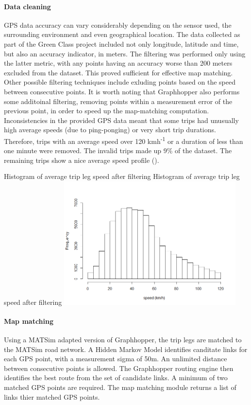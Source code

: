 \paragraph{Data cleaning}
GPS data accuracy can vary considerably depending on the sensor used, the surrounding environment and even geographical location.
The data collected as part of the Green Class project included not only longitude, latitude and time, but also an accuracy indicator, in meters.
The filtering was performed only using the latter metric, with any points having an accuracy worse than 200 meters excluded from the dataset.
This proved sufficient for effective map matching.
Other possible filtering techniques include exluding points based on the speed between consecutive points.
It is worth noting that Graphhopper also performs some additoinal filtering, removing points within a measurement error of the previous point, in order to speed up the map-matching computation.
Inconsistencies in the provided GPS data meant that some trips had unusually high average speeds (due to ping-ponging) or very short trip durations.
Therefore, trips with an average speed over 120 kmh\textsuperscript{-1} or a duration of less than one minute were removed.
The invalid trips made up 9\% of the dataset.
The remaining trips show a nice average speed profile ().

\createfigure%
	{Histogram of average trip leg speed after filtering}
	{Histogram of average trip leg speed after filtering}
    {\label{fig:avg_speeds}}
    {\includegraphics[width=0.7\textwidth]{figures/avg_speed_green_class_matched}}
	{}

\paragraph{Map matching}
Using a MATSim adapted version of Graphhopper, the trip legs are matched to the MATSim road network. A Hidden Markov Model \citep{newson2009hidden} identifies canditate links for each GPS point, with a measurement sigma of 50m. An unlimited distance between consecutive points is allowed. The Graphhopper routing engine then identifies the best route from the set of candidate links. A minimum of two matched GPS points are required. The map matching module returns a list of links thier matched GPS points.

